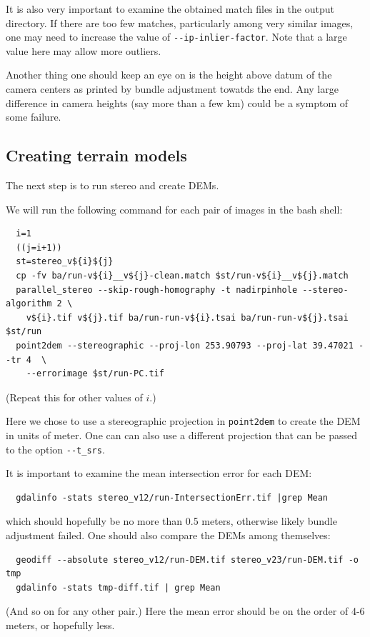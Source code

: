 It is also very important to examine the obtained match files in the 
output directory. If there are too few matches, particularly among very similar
images, one may need to increase the value of \texttt{-\/-ip-inlier-factor}.
Note that a large value here may allow more outliers. 

Another thing one should keep an eye on is the height above datum
of the camera centers as printed by bundle adjustment towatds the end. 
Any large difference in camera heights (say more than a few km) could
be a symptom of some failure.

\subsection{Creating terrain models}
\label{skysat:stereo}

The next step is to run stereo and create DEMs.

We will run the following command for each pair of images in the bash shell: 
\begin{verbatim}
  i=1
  ((j=i+1))
  st=stereo_v${i}${j}
  cp -fv ba/run-v${i}__v${j}-clean.match $st/run-v${i}__v${j}.match
  parallel_stereo --skip-rough-homography -t nadirpinhole --stereo-algorithm 2 \
    v${i}.tif v${j}.tif ba/run-run-v${i}.tsai ba/run-run-v${j}.tsai $st/run
  point2dem --stereographic --proj-lon 253.90793 --proj-lat 39.47021 --tr 4  \
    --errorimage $st/run-PC.tif
\end{verbatim} %
(Repeat this for other values of $i$.)

Here we chose to use a stereographic projection in \texttt{point2dem}
to create the DEM in units of meter. One can can also use a different
projection that can be passed to the option \texttt{-\/-t\_srs}.

It is important to examine the mean intersection error for each DEM:
\begin{verbatim}
  gdalinfo -stats stereo_v12/run-IntersectionErr.tif |grep Mean
\end{verbatim}

which should hopefully be no more than 0.5 meters, otherwise likely 
bundle adjustment failed. One should also compare the DEMs among themselves:
\begin{verbatim}
  geodiff --absolute stereo_v12/run-DEM.tif stereo_v23/run-DEM.tif -o tmp 
  gdalinfo -stats tmp-diff.tif | grep Mean
\end{verbatim}

(And so on for any other pair.) 
Here the mean error should be on the order of 4-6 meters, or hopefully less. 

